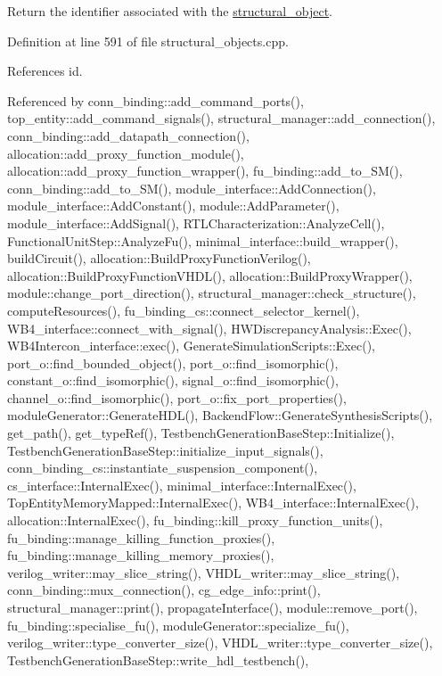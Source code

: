 Return the identifier associated with the \hyperlink{classstructural__object}{structural\+\_\+object}. 



Definition at line 591 of file structural\+\_\+objects.\+cpp.



References id.



Referenced by conn\+\_\+binding\+::add\+\_\+command\+\_\+ports(), top\+\_\+entity\+::add\+\_\+command\+\_\+signals(), structural\+\_\+manager\+::add\+\_\+connection(), conn\+\_\+binding\+::add\+\_\+datapath\+\_\+connection(), allocation\+::add\+\_\+proxy\+\_\+function\+\_\+module(), allocation\+::add\+\_\+proxy\+\_\+function\+\_\+wrapper(), fu\+\_\+binding\+::add\+\_\+to\+\_\+\+S\+M(), conn\+\_\+binding\+::add\+\_\+to\+\_\+\+S\+M(), module\+\_\+interface\+::\+Add\+Connection(), module\+\_\+interface\+::\+Add\+Constant(), module\+::\+Add\+Parameter(), module\+\_\+interface\+::\+Add\+Signal(), R\+T\+L\+Characterization\+::\+Analyze\+Cell(), Functional\+Unit\+Step\+::\+Analyze\+Fu(), minimal\+\_\+interface\+::build\+\_\+wrapper(), build\+Circuit(), allocation\+::\+Build\+Proxy\+Function\+Verilog(), allocation\+::\+Build\+Proxy\+Function\+V\+H\+D\+L(), allocation\+::\+Build\+Proxy\+Wrapper(), module\+::change\+\_\+port\+\_\+direction(), structural\+\_\+manager\+::check\+\_\+structure(), compute\+Resources(), fu\+\_\+binding\+\_\+cs\+::connect\+\_\+selector\+\_\+kernel(), W\+B4\+\_\+interface\+::connect\+\_\+with\+\_\+signal(), H\+W\+Discrepancy\+Analysis\+::\+Exec(), W\+B4\+Intercon\+\_\+interface\+::exec(), Generate\+Simulation\+Scripts\+::\+Exec(), port\+\_\+o\+::find\+\_\+bounded\+\_\+object(), port\+\_\+o\+::find\+\_\+isomorphic(), constant\+\_\+o\+::find\+\_\+isomorphic(), signal\+\_\+o\+::find\+\_\+isomorphic(), channel\+\_\+o\+::find\+\_\+isomorphic(), port\+\_\+o\+::fix\+\_\+port\+\_\+properties(), module\+Generator\+::\+Generate\+H\+D\+L(), Backend\+Flow\+::\+Generate\+Synthesis\+Scripts(), get\+\_\+path(), get\+\_\+type\+Ref(), Testbench\+Generation\+Base\+Step\+::\+Initialize(), Testbench\+Generation\+Base\+Step\+::initialize\+\_\+input\+\_\+signals(), conn\+\_\+binding\+\_\+cs\+::instantiate\+\_\+suspension\+\_\+component(), cs\+\_\+interface\+::\+Internal\+Exec(), minimal\+\_\+interface\+::\+Internal\+Exec(), Top\+Entity\+Memory\+Mapped\+::\+Internal\+Exec(), W\+B4\+\_\+interface\+::\+Internal\+Exec(), allocation\+::\+Internal\+Exec(), fu\+\_\+binding\+::kill\+\_\+proxy\+\_\+function\+\_\+units(), fu\+\_\+binding\+::manage\+\_\+killing\+\_\+function\+\_\+proxies(), fu\+\_\+binding\+::manage\+\_\+killing\+\_\+memory\+\_\+proxies(), verilog\+\_\+writer\+::may\+\_\+slice\+\_\+string(), V\+H\+D\+L\+\_\+writer\+::may\+\_\+slice\+\_\+string(), conn\+\_\+binding\+::mux\+\_\+connection(), cg\+\_\+edge\+\_\+info\+::print(), structural\+\_\+manager\+::print(), propagate\+Interface(), module\+::remove\+\_\+port(), fu\+\_\+binding\+::specialise\+\_\+fu(), module\+Generator\+::specialize\+\_\+fu(), verilog\+\_\+writer\+::type\+\_\+converter\+\_\+size(), V\+H\+D\+L\+\_\+writer\+::type\+\_\+converter\+\_\+size(), Testbench\+Generation\+Base\+Step\+::write\+\_\+hdl\+\_\+testbench(), 